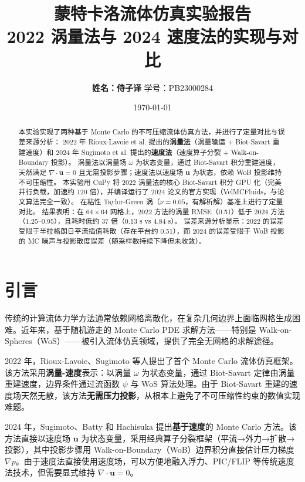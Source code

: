 \documentclass[12pt,a4paper]{article}
\title{\vspace{-1cm}\textbf{\LARGE 蒙特卡洛流体仿真实验报告}\\[0.3cm]
\large 2022 涡量法与 2024 速度法的实现与对比}
\author{\textbf{姓名：侍子译} \quad 学号：PB23000284}
\date{\today}
\begin{document}
\maketitle

\begin{abstract}
本实验实现了两种基于 Monte Carlo 的不可压缩流体仿真方法，并进行了定量对比与误差来源分析：
2022 年 Rioux-Lavoie et al. 提出的\textbf{涡量法}\cite{rioux2022}（涡量输运 + Biot-Savart 重建速度）和 2024 年 Sugimoto et al. 提出的\textbf{速度法}\cite{sugimoto2024}（速度算子分裂 + Walk-on-Boundary 投影）。
涡量法以涡量场 $\omega$ 为状态变量，通过 Biot-Savart 积分重建速度，天然满足 $\nabla\cdot\boldsymbol{u}=0$ 且无需投影步骤；速度法以速度场 $\boldsymbol{u}$ 为状态，依赖 WoB 投影维持不可压缩性。
本实验用 CuPy 将 2022 涡量法的核心 Biot-Savart 积分 GPU 化（完美并行负载，加速约 120 倍），并编译运行了 2024 论文的官方实现（VelMCFluids，与论文算法完全一致）。
在粘性 Taylor-Green 涡（$\nu=0.05$，有解析解）基准上进行了定量对比。
结果表明：在 $64\times64$ 网格上，2022 方法的涡量 RMSE（0.51）低于 2024 方法（1.25--0.95），且耗时低约 37 倍（0.13 s vs 4.84 s）。
误差来源分析显示：2022 的误差受限于半拉格朗日平流插值耗散（存在平台约 0.51），而 2024 的误差受限于 WoB 投影的 MC 噪声与投影散度误差（随采样数持续下降但未收敛）。
\end{abstract}

\section{引言}

传统的计算流体力学方法通常依赖网格离散化，在复杂几何边界上面临网格生成困难。近年来，基于随机游走的 Monte Carlo PDE 求解方法——特别是 Walk-on-Spheres（WoS）——被引入流体仿真领域，提供了完全无网格的求解途径。

2022 年，Rioux-Lavoie、Sugimoto 等人提出了首个 Monte Carlo 流体仿真框架\cite{rioux2022}。该方法采用\textbf{涡量-速度}表示：以涡量 $\omega$ 为状态变量，通过 Biot-Savart 定律由涡量重建速度，边界条件通过流函数 $\psi$ 与 WoS 算法处理。由于 Biot-Savart 重建的速度场天然无散，该方法\textbf{无需压力投影}，从根本上避免了不可压缩性约束的数值实现难题。

2024 年，Sugimoto、Batty 和 Hachisuka 提出\textbf{基于速度}的 Monte Carlo 方法\cite{sugimoto2024}。该方法直接以速度场 $\boldsymbol{u}$ 为状态变量，采用经典算子分裂框架（平流→外力→扩散→投影），其中投影步骤用 Walk-on-Boundary（WoB）边界积分直接估计压力梯度 $\nabla p$。由于速度法直接使用速度场，可以方便地融入浮力、PIC/FLIP 等传统速度法技术，但需要显式维持 $\nabla\cdot\boldsymbol{u}=0$。
\end{document}
